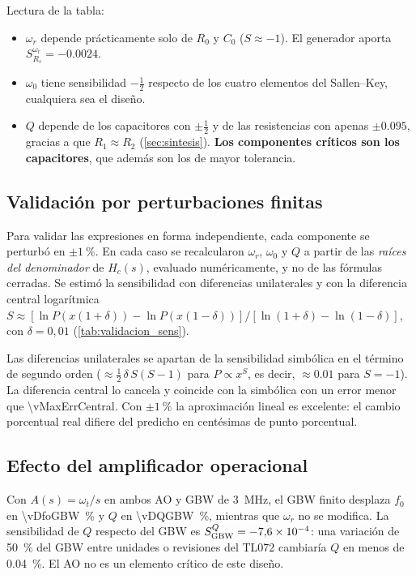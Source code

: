 Lectura de la tabla:
\begin{itemize}
  \item $\omega_r$ depende prácticamente solo de $R_0$ y $C_0$ ($S \approx -1$). El generador aporta $S^{\omega_r}_{R_s} = \num{-0.0024}$.
  \item $\omega_0$ tiene sensibilidad $-\tfrac12$ respecto de los cuatro elementos del Sallen--Key, cualquiera sea el diseño.
  \item $Q$ depende de los capacitores con $\pm\tfrac12$ y de las resistencias con apenas $\pm\num{0.095}$, gracias a que $R_1 \approx R_2$
        (\cref{sec:sintesis}). \textbf{Los componentes críticos son los capacitores}, que además son los de mayor tolerancia.
\end{itemize}

\subsection{Validación por perturbaciones finitas}
Para validar las expresiones en forma independiente, cada componente se perturbó en $\pm\qty{1}{\percent}$. En cada caso se recalcularon $\omega_r$,
$\omega_0$ y $Q$ a partir de las \emph{raíces del denominador} de $H_c(s)$, evaluado numéricamente, y no de las fórmulas cerradas. Se estimó la
sensibilidad con diferencias unilaterales y con la diferencia central logarítmica
$S \approx [\ln P(x(1+\delta)) - \ln P(x(1-\delta))]/[\ln(1+\delta)-\ln(1-\delta)]$, con $\delta = 0{,}01$ (\cref{tab:validacion_sens}).

\begin{table}[H]
  \centering\small
  \caption{Sensibilidades simbólicas frente a perturbaciones de $\pm\qty{1}{\percent}$ (solo las no nulas).}
  \label{tab:validacion_sens}
\end{table}

Las diferencias unilaterales se apartan de la sensibilidad simbólica en el término de segundo orden ($\approx \tfrac12\,\delta\,S(S-1)$ para
$P \propto x^S$, es decir, $\approx \num{0.01}$ para $S = -1$). La diferencia central lo cancela y coincide con la simbólica con un error menor que
\num{\vMaxErrCentral}. Con $\pm\qty{1}{\percent}$ la aproximación lineal es excelente: el cambio porcentual real difiere del predicho en centésimas de
punto porcentual.

\subsection{Efecto del amplificador operacional}
Con $A(s) = \omega_t/s$ en ambos AO y GBW de \qty{3}{\mega\hertz}, el GBW finito desplaza $f_0$ en \qty{\vDfoGBW}{\percent} y $Q$ en
\qty{\vDQGBW}{\percent}, mientras que $\omega_r$ no se modifica. La sensibilidad de $Q$ respecto del GBW es $S^Q_{\mathrm{GBW}} = \num{-7.6e-04}$: una
variación de \qty{50}{\percent} del GBW entre unidades o revisiones del TL072 cambiaría $Q$ en menos de \qty{0.04}{\percent}. El AO no es un
elemento crítico de este diseño.

